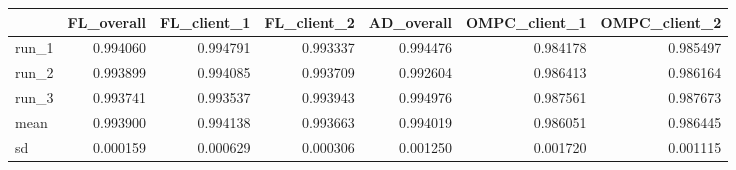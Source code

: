 \begin{tabular}{lrrrrrr}
\toprule
{} &  FL\_overall &  FL\_client\_1 &  FL\_client\_2 &  AD\_overall &  OMPC\_client\_1 &  OMPC\_client\_2 \\
\midrule
run\_1 &    0.994060 &     0.994791 &     0.993337 &    0.994476 &       0.984178 &       0.985497 \\
run\_2 &    0.993899 &     0.994085 &     0.993709 &    0.992604 &       0.986413 &       0.986164 \\
run\_3 &    0.993741 &     0.993537 &     0.993943 &    0.994976 &       0.987561 &       0.987673 \\
mean  &    0.993900 &     0.994138 &     0.993663 &    0.994019 &       0.986051 &       0.986445 \\
sd    &    0.000159 &     0.000629 &     0.000306 &    0.001250 &       0.001720 &       0.001115 \\
\bottomrule
\end{tabular}
